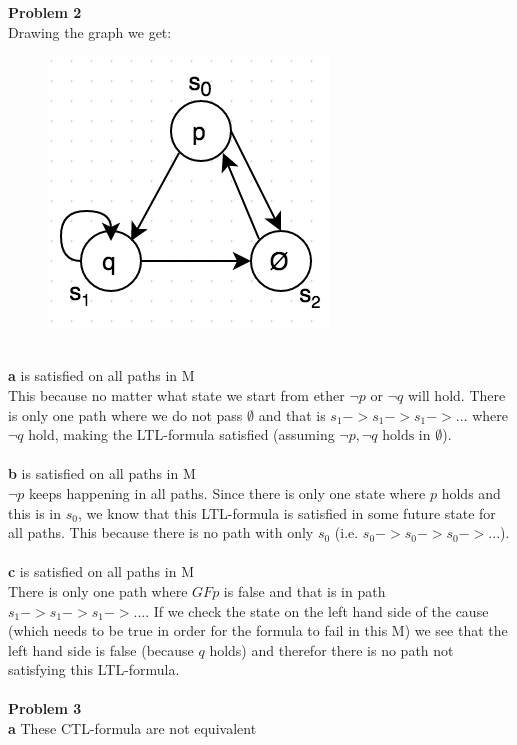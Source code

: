 \documentclass[12pt,oneside,reqno]{amsart}
\begin{document}
\textbf{Problem 2}\\
Drawing the graph we get: 
	\begin{figure}[h]
      	\includegraphics[scale=0.7]{prob2}
	\end{figure}\\
\textbf{a} is satisfied on all paths in M\\
This because no matter what state we start from ether $\neg p$ or $\neg q$ will hold. There is only one path where we do not pass $\emptyset$ and that is $s_1 ->s_1->s_1 ->...$ where $\neg q$ hold, making the LTL-formula satisfied (assuming $\neg p, \neg q \text{ holds in } \emptyset$).\\\\
\textbf{b} is satisfied on all paths in M\\
$\neg p$ keeps happening in all paths. Since there is only one state where $p$ holds and this is in $s_0$, we know that this LTL-formula is satisfied in some future state for all paths. This because there is no path with only $s_0$ (i.e. $s_0->s_0->s_0->...$).\\\\
\textbf{c} is satisfied on all paths in M\\
There is only one path where $GFp$ is false and that is in path $s_1->s_1->s_1->...$. If we check the state on the left hand side of the cause (which needs to be true in order for the formula to fail in this M) we see that the left hand side is false (because $q$ holds) and therefor there is no path not satisfying this LTL-formula.\\\\
\textbf{Problem 3}\\
\textbf{a} These CTL-formula are not equivalent\\
\end{document}

